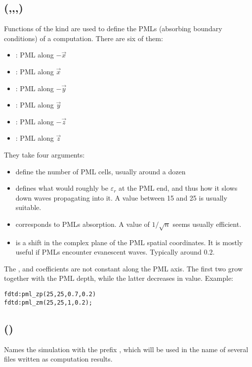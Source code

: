 \subsection[pml\_X]{(,,,)}

Functions of the  kind are used to define the PMLs (absorbing boundary conditions) of a computation. There are six of them:
\begin{itemize}
	\item {}: PML along $-\vec x$
	\item {}: PML along $\vec x$
	\item {}: PML along $-\vec y$
	\item {}: PML along $\vec y$
	\item {}: PML along $-\vec z$
	\item {}: PML along $\vec z$
\end{itemize}
They take four arguments:
\begin{itemize}
	\item {} define the number of PML cells, usually around a dozen
	\item {} defines what would roughly be $\varepsilon_r$ at the PML end, and thus how it slows down waves propagating into it. A value between 15 and 25 is usually suitable.
	\item {} corresponds to PMLs absorption. A value of $1/\sqrt{n}$ seems usually efficient.
	\item {} is a shift in the complex plane of the PML spatial coordinates. It is mostly useful if PMLs encounter evanescent waves. Typically around $0.2$.
\end{itemize}
The ,  and  coefficients are not constant along the PML axis. The first two grow together with the PML depth, while the latter decreases in value.
Example:

\begin{lstlisting}
fdtd:pml_zp(25,25,0.7,0.2)
fdtd:pml_zm(25,25,1,0.2);
\end{lstlisting}

\subsection[prefix]{()}

Names the simulation with the prefix , which will be used in the name of several files written as computation results.

